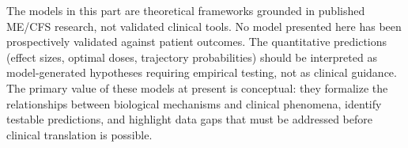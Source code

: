\begin{limitation}
The models in this part are theoretical frameworks grounded in published ME/CFS research, not validated clinical tools. No model presented here has been prospectively validated against patient outcomes. The quantitative predictions (effect sizes, optimal doses, trajectory probabilities) should be interpreted as model-generated hypotheses requiring empirical testing, not as clinical guidance. The primary value of these models at present is conceptual: they formalize the relationships between biological mechanisms and clinical phenomena, identify testable predictions, and highlight data gaps that must be addressed before clinical translation is possible.
\end{limitation}
